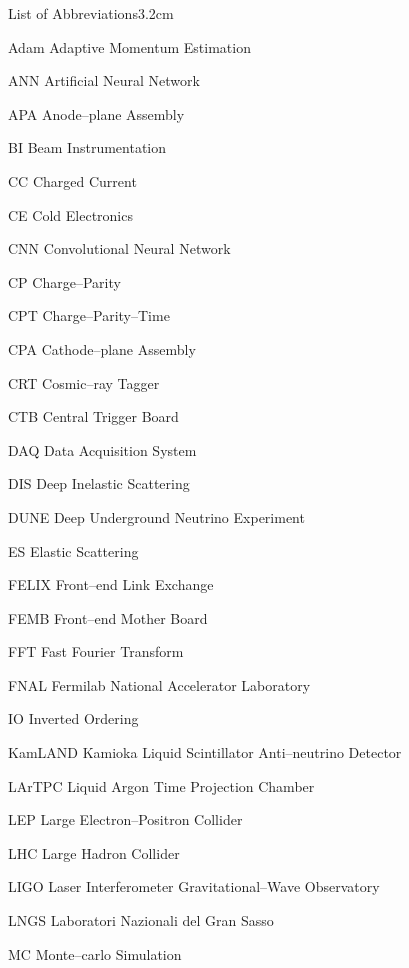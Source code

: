\begin{mclistof}{List of Abbreviations}{3.2cm}
	\item [ Adam       ] {Adaptive Momentum Estimation}
	\item [ ANN        ] {Artificial Neural Network}
	\item [ APA        ] {Anode--plane Assembly}
	\item [ BI         ] {Beam Instrumentation}
	\item [ CC         ] {Charged Current}
	\item [ CE         ] {Cold Electronics}
	\item [ CNN        ] {Convolutional Neural Network}
	\item [ CP         ] {Charge--Parity}
	\item [ CPT        ] {Charge--Parity--Time}
	\item [ CPA        ] {Cathode--plane Assembly}
	\item [ CRT        ] {Cosmic--ray Tagger}
	\item [ CTB        ] {Central Trigger Board}
	\item [ DAQ        ] {Data Acquisition System}
	\item [ DIS        ] {Deep Inelastic Scattering}
	\item [ DUNE       ] {Deep Underground Neutrino Experiment}
	\item [ ES         ] {Elastic Scattering}
	\item [ FELIX      ] {Front--end Link Exchange}
	\item [ FEMB       ] {Front--end Mother Board}
	\item [ FFT        ] {Fast Fourier Transform}
	\item [ FNAL       ] {Fermilab National Accelerator Laboratory}
	\item [ IO         ] {Inverted Ordering}
	\item [ KamLAND    ] {Kamioka Liquid Scintillator Anti--neutrino Detector}
	\item [ LArTPC     ] {Liquid Argon Time Projection Chamber}
	\item [ LEP        ] {Large Electron--Positron Collider}
	\item [ LHC        ] {Large Hadron Collider}
	\item [ LIGO       ] {Laser Interferometer Gravitational--Wave Observatory}
	\item [ LNGS       ] {Laboratori Nazionali del Gran Sasso}
	\item [ MC         ] {Monte--carlo Simulation}

\end{mclistof}
